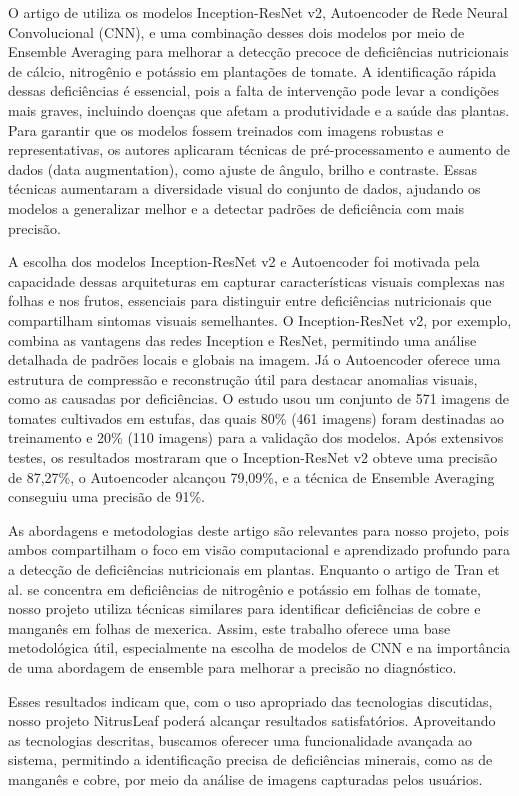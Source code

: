 O artigo de \textcite{EstadoArte3} utiliza os modelos Inception-ResNet v2, Autoencoder de Rede Neural Convolucional (CNN), e uma combinação desses dois modelos por meio de Ensemble Averaging para melhorar a detecção precoce de deficiências nutricionais de cálcio, nitrogênio e potássio em plantações de tomate. A identificação rápida dessas deficiências é essencial, pois a falta de intervenção pode levar a condições mais graves, incluindo doenças que afetam a produtividade e a saúde das plantas. Para garantir que os modelos fossem treinados com imagens robustas e representativas, os autores aplicaram técnicas de pré-processamento e aumento de dados (data augmentation), como ajuste de ângulo, brilho e contraste. Essas técnicas aumentaram a diversidade visual do conjunto de dados, ajudando os modelos a generalizar melhor e a detectar padrões de deficiência com mais precisão.

A escolha dos modelos Inception-ResNet v2 e Autoencoder foi motivada pela capacidade dessas arquiteturas em capturar características visuais complexas nas folhas e nos frutos, essenciais para distinguir entre deficiências nutricionais que compartilham sintomas visuais semelhantes. O Inception-ResNet v2, por exemplo, combina as vantagens das redes Inception e ResNet, permitindo uma análise detalhada de padrões locais e globais na imagem. Já o Autoencoder oferece uma estrutura de compressão e reconstrução útil para destacar anomalias visuais, como as causadas por deficiências. O estudo usou um conjunto de 571 imagens de tomates cultivados em estufas, das quais 80\% (461 imagens) foram destinadas ao treinamento e 20\% (110 imagens) para a validação dos modelos. Após extensivos testes, os resultados mostraram que o Inception-ResNet v2 obteve uma precisão de 87,27\%, o Autoencoder alcançou 79,09\%, e a técnica de Ensemble Averaging conseguiu uma precisão de 91\%.

As abordagens e metodologias deste artigo são relevantes para nosso projeto, pois ambos compartilham o foco em visão computacional e aprendizado profundo para a detecção de deficiências nutricionais em plantas. Enquanto o artigo de Tran et al. se concentra em deficiências de nitrogênio e potássio em folhas de tomate, nosso projeto utiliza técnicas similares para identificar deficiências de cobre e manganês em folhas de mexerica. Assim, este trabalho oferece uma base metodológica útil, especialmente na escolha de modelos de CNN e na importância de uma abordagem de ensemble para melhorar a precisão no diagnóstico.

Esses resultados indicam que, com o uso apropriado das tecnologias discutidas, nosso projeto NitrusLeaf poderá alcançar resultados satisfatórios. Aproveitando as tecnologias descritas, buscamos oferecer uma funcionalidade avançada ao sistema, permitindo a identificação precisa de deficiências minerais, como as de manganês e cobre, por meio da análise de imagens capturadas pelos usuários.